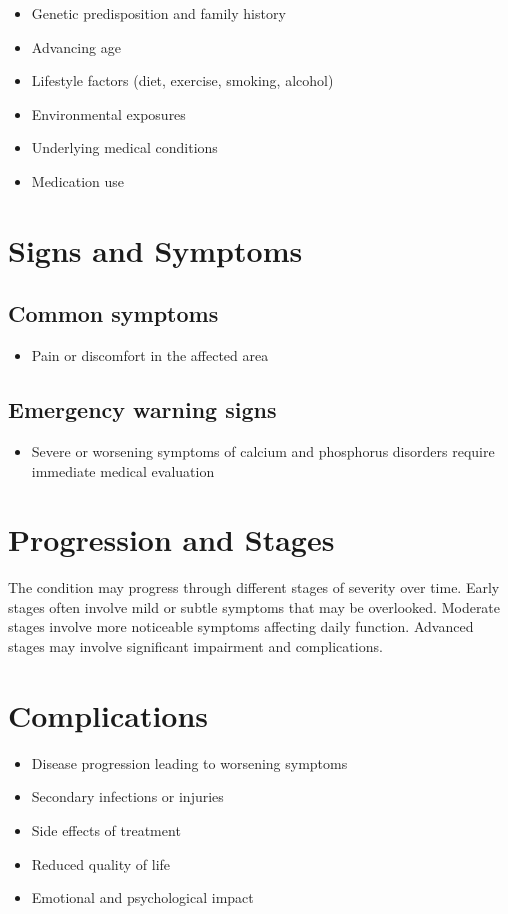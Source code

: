 \begin{itemize}[noitemsep]
  \item Genetic predisposition and family history
  \item Advancing age
  \item Lifestyle factors (diet, exercise, smoking, alcohol)
  \item Environmental exposures
  \item Underlying medical conditions
  \item Medication use
\end{itemize}
\section{Signs and Symptoms}

\subsection{Common symptoms}
\begin{itemize}[noitemsep]
  \item Pain or discomfort in the affected area
  \end{itemize}

\subsection{Emergency warning signs}
\begin{itemize}[noitemsep]
  \item Severe or worsening symptoms of calcium and phosphorus disorders require immediate medical evaluation
\end{itemize}
\section{Progression and Stages}
The condition may progress through different stages of severity over time. Early stages often involve mild or subtle symptoms that may be overlooked. Moderate stages involve more noticeable symptoms affecting daily function. Advanced stages may involve significant impairment and complications.
\section{Complications}
\begin{itemize}[noitemsep]
  \item Disease progression leading to worsening symptoms
  \item Secondary infections or injuries
  \item Side effects of treatment
  \item Reduced quality of life
  \item Emotional and psychological impact
\end{itemize}
